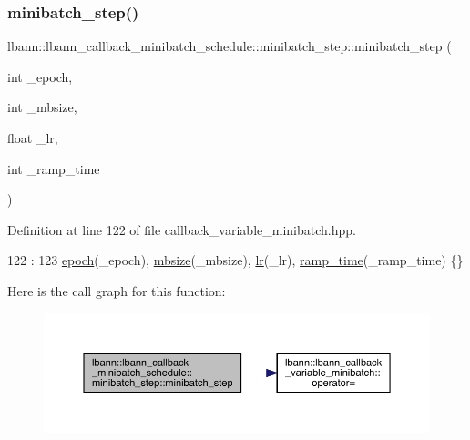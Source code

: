 \subsubsection{\texorpdfstring{minibatch\+\_\+step()}{minibatch\_step()}}
{\footnotesize\ttfamily lbann\+::lbann\+\_\+callback\+\_\+minibatch\+\_\+schedule\+::minibatch\+\_\+step\+::minibatch\+\_\+step (\begin{DoxyParamCaption}\item[{int}]{\+\_\+epoch,  }\item[{int}]{\+\_\+mbsize,  }\item[{float}]{\+\_\+lr,  }\item[{int}]{\+\_\+ramp\+\_\+time }\end{DoxyParamCaption})\hspace{0.3cm}{\ttfamily [inline]}}



Definition at line 122 of file callback\+\_\+variable\+\_\+minibatch.\+hpp.


\begin{DoxyCode}
122                                                                        :
123       \hyperlink{structlbann_1_1lbann__callback__minibatch__schedule_1_1minibatch__step_ac5f8dae80a258168a9650ad55a2965d9}{epoch}(\_epoch), \hyperlink{structlbann_1_1lbann__callback__minibatch__schedule_1_1minibatch__step_a51af7cf1ea3d8b0c7f92812ab71ee921}{mbsize}(\_mbsize), \hyperlink{structlbann_1_1lbann__callback__minibatch__schedule_1_1minibatch__step_a708c92504c27e6e26b40877f5c756ce1}{lr}(\_lr), \hyperlink{structlbann_1_1lbann__callback__minibatch__schedule_1_1minibatch__step_aff33b3fadf607df0d942ffa642e0f927}{ramp\_time}(\_ramp\_time) \{\}
\end{DoxyCode}
Here is the call graph for this function\+:\nopagebreak
\begin{figure}[H]
\begin{center}
\leavevmode
\includegraphics[width=350pt]{structlbann_1_1lbann__callback__minibatch__schedule_1_1minibatch__step_a76efb978eebc607dd1f7be0e464ac447_cgraph}
\end{center}
\end{figure}


